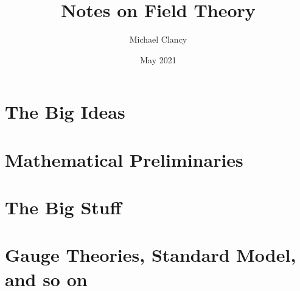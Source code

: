 \documentclass{book}
\title{Notes on Field Theory}
\author{Michael Clancy}
\date{May 2021}
\begin{document}
\maketitle
\tableofcontents


\part{The Big Ideas}





\part{Mathematical Preliminaries}




\part{The Big Stuff}








\part{Gauge Theories, Standard Model, and so on}



\end{document}
